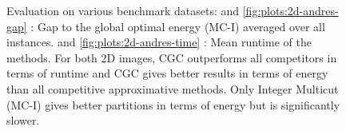 \begin{center}
\begin{figure}
%
\caption[Evaluation of CGC on 2D datasets]{%
Evaluation on various benchmark datasets:
 and \cref{fig:plots:2d-andres-gap} :
Gap to the global optimal energy (MC-I) averaged over all instances.
 and \cref{fig:plots:2d-andres-time} :
Mean runtime of the methods.
For both 2D images,
CGC outperforms all competitors in terms of runtime and CGC gives better results in
terms of energy than all competitive approximative methods.
Only Integer Multicut (MC-I) gives better partitions in terms of energy but is
significantly slower.
}


\end{figure}
\end{center}




